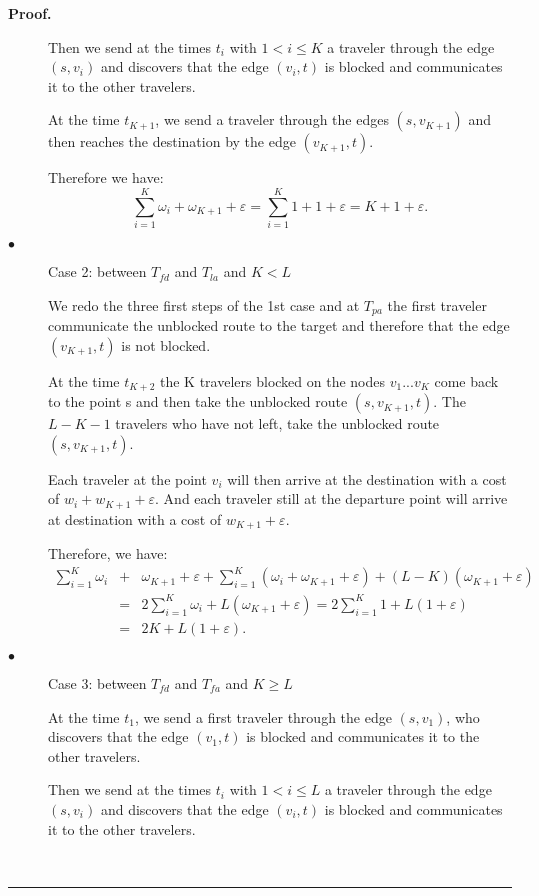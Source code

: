 \documentclass[a4paper, 10pt]{article}
\newenvironment{proof}[1][Proof]{\textbf{#1.} }{\ \rule{0.5em}{0.5em}}
\begin{document}
\begin{proof}
\begin{description}
Then we send at the times $t_i$ with $1 < i \leq K$ a traveler through the edge $(s,v_i)$ and discovers that the edge $(v_i,t)$ is blocked and communicates it to the other travelers.

At the time $t_{K+1}$, we send a traveler through the edges $(s,v_{K+1})$ and then reaches the destination by the edge $(v_{K+1},t)$. 

Therefore we have: 
\[
\sum_{i=1}^{K} \omega_{i} + \omega_{K+1} + \varepsilon = \sum_{i=1}^{K} 1 + 1 + \varepsilon = K + 1 + \varepsilon.
\]

\item[$\bullet$] Case 2: between $T_{fd}$ and $T_{la}$ and $K<L$

We redo the three first steps of the 1st case and at $ T_{pa} $ the first traveler communicate the unblocked route to the target and therefore that the edge $(v_{K+1},t)$ is not blocked.

At the time $t_{K+2}$ the K travelers blocked on the nodes $v_{1} ... v_K $ come back to the point s and then take the unblocked route $(s,v_{K+1},t)$. The $L-K-1$ travelers who have not left, take the unblocked route $(s,v_{K+1},t)$.

Each traveler at the point $v_i$ will then arrive at the destination with a cost of $w_i + w_{K+1} + \varepsilon$. And each traveler still at the departure point will arrive at destination with a cost of $w_{K+1} + \varepsilon$.

Therefore, we have:
\begin{eqnarray}
\sum_{i=1}^{K} \omega_{i} &+& \omega_{K+1} + \varepsilon + \sum_{i=1}^{K}(\omega_{i} + \omega_{K+1} + \varepsilon) + (L - K) ( \omega_{K+1} + \varepsilon ) \nonumber \\
&=& 2\sum_{i=1}^{K} \omega_{i} + L(\omega_{K+1} + \varepsilon ) = 2\sum_{i=1}^{K} 1+ L(1 + \varepsilon ) \nonumber \\
&=& 2K+ L(1 + \varepsilon ). \nonumber
\end{eqnarray}


\item[$\bullet$] Case 3: between $T_{fd}$ and $T_{fa}$ and $K \geq L$

At the time $t_1$, we send a first traveler through the edge $(s,v_1)$, who discovers that the edge $(v_1,t)$ is blocked and communicates it to the other travelers.

Then we send at the times $t_i$ with $1 < i \leq L$ a traveler through the edge $(s,v_i)$ and discovers that the edge $(v_i,t)$ is blocked and communicates it to the other travelers.


\end{description}
\end{proof}
\end{document}
